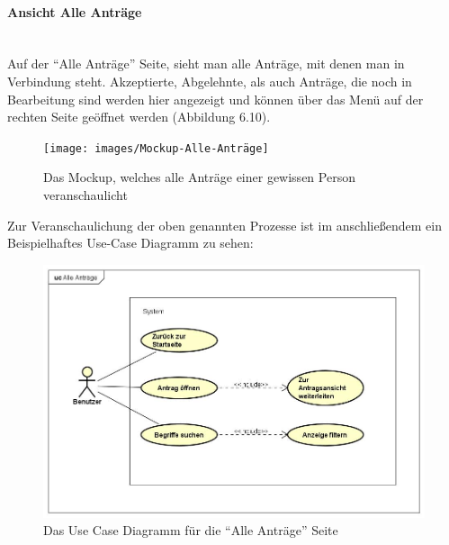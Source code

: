 \paragraph{Ansicht Alle Anträge}
~\\
Auf der \enquote{Alle Anträge} Seite, sieht man alle Anträge, mit denen man in Verbindung steht. Akzeptierte, Abgelehnte, als auch Anträge, die noch in Bearbeitung sind werden hier angezeigt und können über das Menü auf der rechten Seite geöffnet werden (Abbildung 6.10).
\begin{figure}[H]
	\centering
	\texttt{[image: images/Mockup-Alle-Anträge]}
	\caption[Mockup Alle Anträge]{Das Mockup, welches alle Anträge einer gewissen Person veranschaulicht}
	\label{fig:mockupAlle}
\end{figure}
Zur Veranschaulichung der oben genannten Prozesse ist im anschließendem ein Beispielhaftes Use-Case Diagramm zu sehen: 
\begin{figure}[H]
	\centering
	\includegraphics[width=1\linewidth]{images/uc-all}
	\caption[Use Case Diagramm Alle Anträge]{Das Use Case Diagramm für die \enquote{Alle Anträge} Seite}
	\label{fig:ucAll}
\end{figure}
\newpage
